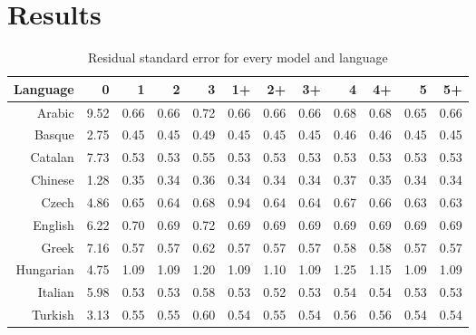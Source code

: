 \documentclass[paper=a4, fontsize=11pt]{scrartcl} %
\begin{document}
\section{Results}
\begin{table}
\begin{adjustbox}{center}
\centering
\begin{tabular}{rrrrrrrrrrrr}
  Language & 0 & 1 & 2 & 3 & 1+ & 2+ & 3+ & 4 & 4+ & 5 & 5+ \\
  \midrule
Arabic & 9.52 & 0.66 & 0.66 & 0.72 & 0.66 & 0.66 & 0.66 & 0.68 & 0.68 & 0.65 & 0.66 \\
  Basque & 2.75 & 0.45 & 0.45 & 0.49 & 0.45 & 0.45 & 0.45 & 0.46 & 0.46 & 0.45 & 0.45 \\
  Catalan & 7.73 & 0.53 & 0.53 & 0.55 & 0.53 & 0.53 & 0.53 & 0.53 & 0.53 & 0.53 & 0.53 \\
  Chinese & 1.28 & 0.35 & 0.34 & 0.36 & 0.34 & 0.34 & 0.34 & 0.37 & 0.35 & 0.34 & 0.34 \\
  Czech & 4.86 & 0.65 & 0.64 & 0.68 & 0.94 & 0.64 & 0.64 & 0.67 & 0.66 & 0.63 & 0.63 \\
  English & 6.22 & 0.70 & 0.69 & 0.72 & 0.69 & 0.69 & 0.69 & 0.69 & 0.69 & 0.69 & 0.69 \\
  Greek & 7.16 & 0.57 & 0.57 & 0.62 & 0.57 & 0.57 & 0.57 & 0.58 & 0.58 & 0.57 & 0.57 \\
  Hungarian & 4.75 & 1.09 & 1.09 & 1.20 & 1.09 & 1.10 & 1.09 & 1.25 & 1.15 & 1.09 & 1.09 \\
  Italian & 5.98 & 0.53 & 0.53 & 0.58 & 0.53 & 0.52 & 0.53 & 0.54 & 0.54 & 0.53 & 0.53 \\
  Turkish & 3.13 & 0.55 & 0.55 & 0.60 & 0.54 & 0.55 & 0.54 & 0.56 & 0.56 & 0.54 & 0.54 \\
   \bottomrule
\end{tabular}
\end{adjustbox}
\caption{Residual standard error for every model and language}
\label{tab:s}
\end{table}
\end{document}
